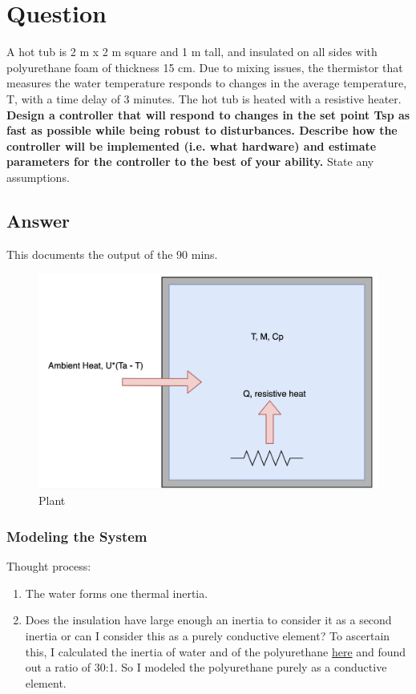 \section{Question}
A hot tub is 2 m x 2 m square and 1 m tall, and insulated on all sides with polyurethane
foam of thickness 15 cm. Due to mixing issues, the thermistor that measures the water
temperature responds to changes in the average temperature, T, with a time delay of 3
minutes. The hot tub is heated with a resistive heater. \textbf{Design a controller that will
respond to changes in the set point Tsp as fast as possible while being robust to
disturbances. Describe how the controller will be implemented (i.e. what hardware)
and estimate parameters for the controller to the best of your ability.} State any
assumptions.

\subsection *{Answer}

This documents the output of the 90 mins.

\begin{figure}[h!]
  \includegraphics[scale=0.4]{plant}
  \caption{Plant}
\end{figure}

\subsubsection *{Modeling the System}

Thought process:
\begin{enumerate}
  \item The water forms one thermal inertia.
  \item Does the insulation have large enough an inertia to consider it as a second inertia or can I consider this as a purely conductive element? To ascertain this, I calculated the inertia of water and of the polyurethane \href{https://bit.ly/treaucalcs}{here} and found out a ratio of 30:1. So I modeled the polyurethane purely as a conductive element. 
\end{enumerate}

